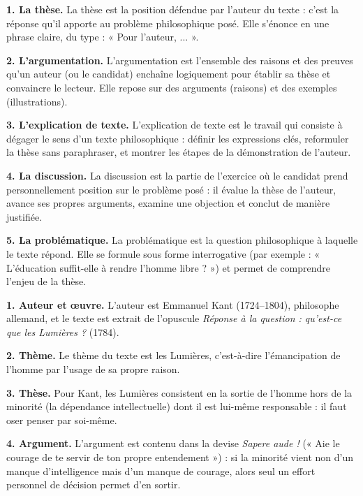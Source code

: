 \documentclass[11pt]{article}
\begin{document}
\begin{corrige}
\textbf{1. La thèse.} La thèse est la position défendue par l'auteur du texte : c'est la réponse qu'il apporte au problème philosophique posé. Elle s'énonce en une phrase claire, du type : « Pour l'auteur, ... ».

\textbf{2. L'argumentation.} L'argumentation est l'ensemble des raisons et des preuves qu'un auteur (ou le candidat) enchaîne logiquement pour établir sa thèse et convaincre le lecteur. Elle repose sur des arguments (raisons) et des exemples (illustrations).

\textbf{3. L'explication de texte.} L'explication de texte est le travail qui consiste à dégager le sens d'un texte philosophique : définir les expressions clés, reformuler la thèse sans paraphraser, et montrer les étapes de la démonstration de l'auteur.

\textbf{4. La discussion.} La discussion est la partie de l'exercice où le candidat prend personnellement position sur le problème posé : il évalue la thèse de l'auteur, avance ses propres arguments, examine une objection et conclut de manière justifiée.

\textbf{5. La problématique.} La problématique est la question philosophique à laquelle le texte répond. Elle se formule sous forme interrogative (par exemple : « L'éducation suffit-elle à rendre l'homme libre ? ») et permet de comprendre l'enjeu de la thèse.
\end{corrige}

\begin{corrige}
\textbf{1. Auteur et œuvre.} L'auteur est Emmanuel Kant (1724--1804), philosophe allemand, et le texte est extrait de l'opuscule \emph{Réponse à la question : qu'est-ce que les Lumières ?} (1784).

\textbf{2. Thème.} Le thème du texte est les Lumières, c'est-à-dire l'émancipation de l'homme par l'usage de sa propre raison.

\textbf{3. Thèse.} Pour Kant, les Lumières consistent en la sortie de l'homme hors de la minorité (la dépendance intellectuelle) dont il est lui-même responsable : il faut oser penser par soi-même.

\textbf{4. Argument.} L'argument est contenu dans la devise \emph{Sapere aude !} (« Aie le courage de te servir de ton propre entendement ») : si la minorité vient non d'un manque d'intelligence mais d'un manque de courage, alors seul un effort personnel de décision permet d'en sortir.
\end{corrige}
\end{document}
